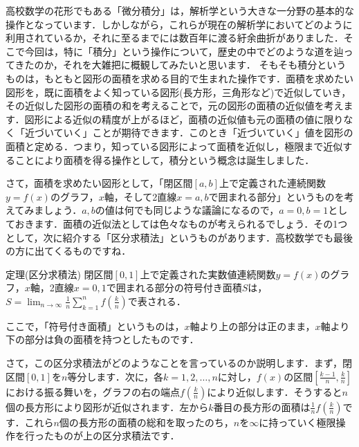 



高校数学の花形でもある「微分積分」は，解析学という大きな一分野の基本的な操作となっています．しかしながら，これらが現在の解析学においてどのように利用されているか，それに至るまでには数百年に渡る紆余曲折がありました．そこで今回は，特に「積分」という操作について，歴史の中でどのような道を辿ってきたのか，それを大雑把に概観してみたいと思います．
そもそも積分というものは，もともと図形の面積を求める目的で生まれた操作です．面積を求めたい図形を，既に面積をよく知っている図形(長方形，三角形など)で近似していき，その近似した図形の面積の和を考えることで，元の図形の面積の近似値を考えます．図形による近似の精度が上がるほど，面積の近似値も元の面積の値に限りなく「近づいていく」ことが期待できます．このとき「近づいていく」値を図形の面積と定める．つまり，知っている図形によって面積を近似し，極限まで近似することにより面積を得る操作として，積分という概念は誕生しました．
\par さて，面積を求めたい図形として，「閉区間$[a,b]$上で定義された連続関数$y=f(x)$のグラフ，$x$軸，そして2直線$x=a,b$で囲まれる部分」というものを考えてみましょう．$a,b$の値は何でも同じような議論になるので，$a=0,b=1$としておきます．面積の近似法としては色々なものが考えられるでしょう．その1つとして，次に紹介する「区分求積法」というものがあります．高校数学でも最後の方に出てくるものですね．
\begin{itembox}[l]{定理(区分求積法)}
閉区間$[0,1]$上で定義された実数値連続関数$y=f(x)$のグラフ，$x$軸，2直線$x=0,1$で囲まれる部分の符号付き面積$S$は，$S=\displaystyle \lim_{n \to \infty}\frac{1}{n}\sum_{k=1}^n f\left(\frac{k}{n}\right)$で表される．
\end{itembox}
\par ここで，「符号付き面積」というものは，$x$軸より上の部分は正のまま，$x$軸より下の部分は負の面積を持つとしたものです．
\par さて，この区分求積法がどのようなことを言っているのか説明します．まず，閉区間$[0,1]$を$n$等分します．次に，各$k=1,2,\ldots ,n$に対し，$f(x)$の区間$\left[ \frac{k-1}{n},\frac{k}{n}\right]$における振る舞いを，グラフの右の端点$f\left(\frac{k}{n}\right)$により近似します．そうすると$n$個の長方形により図形が近似されます．左から$k$番目の長方形の面積は$\frac{1}{n}f\left(\frac{k}{n}\right)$です．これら$n$個の長方形の面積の総和を取ったのち，$n$を$\infty$に持っていく極限操作を行ったものが上の区分求積法です．
